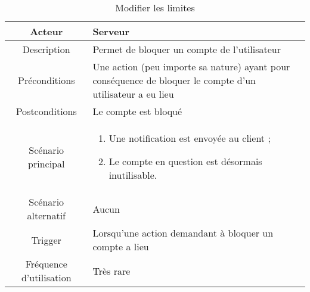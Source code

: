 \documentclass{article}
\begin{document}
\begin{table}

\begin{tabular}{|c|p{11cm}|}
\hline
Acteur & Serveur \\
\hline
Description & Permet de bloquer un compte de l'utilisateur \\
\hline
Préconditions & Une action (peu importe sa nature) ayant pour conséquence de bloquer le compte d'un utilisateur a eu lieu \\
\hline
Postconditions & Le compte est bloqué \\
\hline
Scénario principal & \begin{enumerate}
\item Une notification est envoyée au client ;
\item Le compte en question est désormais inutilisable.
\end{enumerate} \\
\hline
Scénario alternatif & Aucun \\
\hline
Trigger & Lorsqu'une action demandant à bloquer un compte a lieu \\
\hline
Fréquence d'utilisation & Très rare \\
\hline
\end{tabular}

\caption{Modifier les limites}

\end{table}
\end{document}
